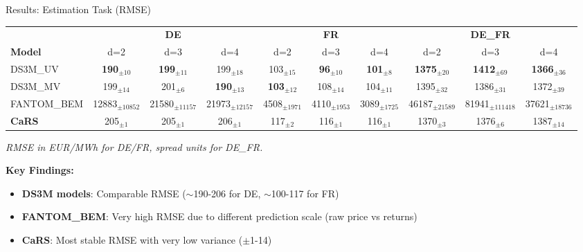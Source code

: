 \documentclass[aspectratio=169]{beamer}
\begin{document}
\begin{frame}{Results: Estimation Task (RMSE)}
\begin{table}
\centering
\small
\begin{adjustbox}{max width=\textwidth}
\begin{tabular}{l|ccc|ccc|ccc}
\toprule
& \multicolumn{3}{c|}{\textbf{DE}} & \multicolumn{3}{c|}{\textbf{FR}} & \multicolumn{3}{c}{\textbf{DE\_FR}} \\
\textbf{Model} & d=2 & d=3 & d=4 & d=2 & d=3 & d=4 & d=2 & d=3 & d=4 \\
\midrule
DS3M\_UV & \textbf{190}$_{\pm10}$ & \textbf{199}$_{\pm11}$ & 199$_{\pm18}$ & 103$_{\pm15}$ & \textbf{96}$_{\pm10}$ & \textbf{101}$_{\pm8}$ & \textbf{1375}$_{\pm20}$ & \textbf{1412}$_{\pm69}$ & \textbf{1366}$_{\pm36}$ \\
DS3M\_MV & 199$_{\pm14}$ & 201$_{\pm6}$ & \textbf{190}$_{\pm13}$ & \textbf{103}$_{\pm12}$ & 108$_{\pm14}$ & 104$_{\pm11}$ & 1395$_{\pm32}$ & 1386$_{\pm31}$ & 1372$_{\pm39}$ \\
FANTOM\_BEM & 12883$_{\pm10852}$ & 21580$_{\pm11157}$ & 21973$_{\pm12157}$ & 4508$_{\pm1971}$ & 4110$_{\pm1953}$ & 3089$_{\pm1725}$ & 46187$_{\pm21589}$ & 81941$_{\pm111418}$ & 37621$_{\pm18736}$ \\
\midrule
\textbf{CaRS} & 205$_{\pm1}$ & 205$_{\pm1}$ & 206$_{\pm1}$ & 117$_{\pm2}$ & 116$_{\pm1}$ & 116$_{\pm1}$ & 1370$_{\pm3}$ & 1376$_{\pm6}$ & 1387$_{\pm14}$ \\
\bottomrule
\end{tabular}
\end{adjustbox}
\end{table}

\vspace{0.2cm}
{\scriptsize \textit{RMSE in EUR/MWh for DE/FR, spread units for DE\_FR.}}%

\vspace{0.2cm}
\textbf{Key Findings:}
\begin{itemize}
    \item \textbf{DS3M models}: Comparable RMSE ($\sim$190-206 for DE, $\sim$100-117 for FR)
    \item \textbf{FANTOM\_BEM}: Very high RMSE due to different prediction scale (raw price vs returns)
    \item \textbf{CaRS}: Most stable RMSE with very low variance ($\pm$1-14)
\end{itemize}
\end{frame}
\end{document}
